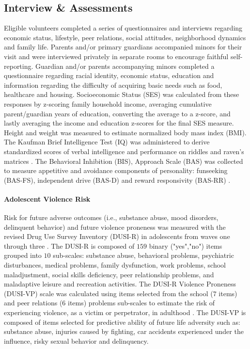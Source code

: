 \documentclass[utf8]{article}
\begin{document}
\subsection{Interview \& Assessments}
Eligible volunteers completed a series of questionnaires and interviews regarding economic status, lifestyle, peer relations, social attitudes, neighborhood dynamics and family life. Parents and/or primary guardians accompanied minors for their visit and were interviewed privately in separate rooms to encourage faithful self-reporting. Guardian and/or parents accompanying minors completed a questionnaire regarding racial identity, economic status, education and information regarding the difficulty of acquiring basic needs such as food, healthcare and housing. Socioeconomic Status (SES) was calculated from these responses by z-scoring family household income, averaging cumulative parent/guardian years of education, converting the average to a z-score, and lastly averaging the income and education z-scores for the final SES measure. Height and weight was measured to estimate normalized body mass index (BMI). The Kaufman Brief Intelligence Test (IQ) was administered to derive standardized scores of verbal intelligence and performance on riddles and raven’s matrices \citep{kaufman2004kaufman}. The Behavioral Inhibition (BIS), Approach Scale (BAS) was collected to measure appetitive and avoidance components of personality:  funseeking (BAS-FS), independent drive (BAS-D) and reward responsivity (BAS-RR) \citep{carver1994behavioral}.
\paragraph{Adolescent Violence Risk} 
Risk for future adverse outcomes (i.e., substance abuse, mood disorders, delinquent behavior) and future violence proneness was measured with the revised Drug Use Survey Inventory (DUSI-R) in adolescents from waves one through three  \citep*{tarter1994reliability}. The DUSI-R is composed of $159$ binary ("yes","no") items grouped into $10$ sub-scales: substance abuse, behavioral problems, psychiatric disturbances, medical problems, family dysfunction, work problems, school maladjustment, social skills deficiency, peer relationship problems, and maladaptive leisure and recreation activities. The DUSI-R Violence Proneness (DUSI-VP) scale was calculated using items selected from the school ($7$ items) and peer relations ($6$ items) problems sub-scales to estimate the risk of experiencing violence, as a victim or perpetrator, in adulthood \citep*{kirisci2009violence}. The DUSI-VP is composed of items selected for predictive ability of future life adversity such as: substance abuse, injuries caused by fighting, car accidents experienced under the influence, risky sexual behavior and delinquency.
\end{document}
